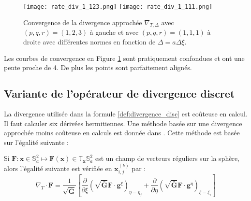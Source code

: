 \begin{figure}[htbp]
\begin{center}
\texttt{[image: rate\_div\_1\_123.png]}
\texttt{[image: rate\_div\_1\_111.png]}
\end{center}
\caption{Convergence de la divergence approchée $\nabla_{T,\Delta}$ avec $(p,q,r)=(1,2,3)$ à gauche et avec $(p,q,r)=(1,1,1)$ à droite avec différentes normes en fonction de $\Delta = a \Delta \xi$.}
\label{fig:rate_div1}
\end{figure}

Les courbes de convergence en Figure \ref{fig:rate_div1} sont pratiquement confondues et ont une pente proche de 4. De plus les points sont parfaitement alignés.


\subsection{Variante de l'opérateur de divergence discret}

La divergence utilisée dans la formule \eqref{def:divergence_disc} est coûteuse en calcul. Il faut calculer six dérivées hermitiennes. Une méthode basée sur une divergence approchée moins coûteuse en calculs est donnée dans \cite{Croisille2015}. Cette méthode est basée sur l'égalité suivante :

\begin{proposition}
Si $\mathbf{F} : \mathbf{x} \in \mathbb{S}_a^2 \mapsto \mathbf{F}(\mathbf{x}) \in \mathbb{T}_{\mathbf{x}} \mathbb{S}_a^2$ est un champ de vecteurs réguliers sur la sphère, alors l'égalité suivante est vérifiée en $\mathbf{x}_{i,j}^{(k)}$ par :
\begin{equation}
\nabla_T \cdot \mathbf{F} = \dfrac{1}{\sqrt{\bar{\mathbf{G}}}} \left[ \dfrac{\partial}{\partial \xi} \left( \sqrt{\bar{\mathbf{G}}} \mathbf{F} \cdot \mathbf{g}^{\xi} \right)_{\eta = \eta_j} + 
\dfrac{\partial}{\partial \eta} \left( \sqrt{\bar{\mathbf{G}}} \mathbf{F} \cdot \mathbf{g}^{\eta} \right)_{\xi = \xi_i}
\right]
\label{eq:divergence_v2}
\end{equation}
\end{proposition}

